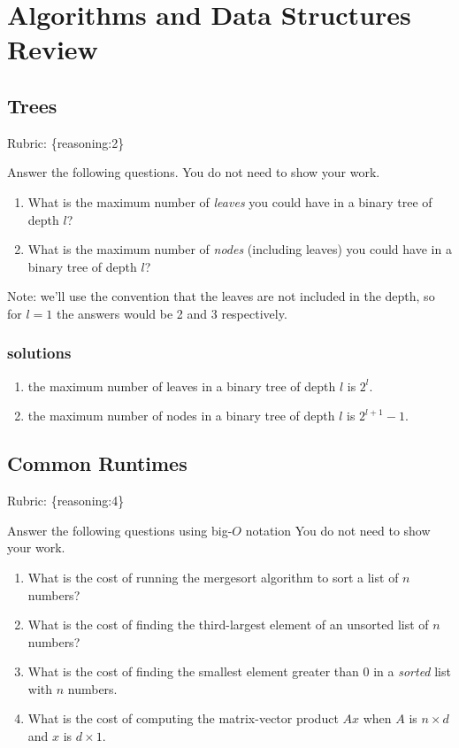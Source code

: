 \documentclass{article}
\def\rubric#1{\gre{Rubric: \{#1\}}}{}
\def\blu#1{{\color{blu}#1}}
\def\gre#1{{\color{gre}#1}}
\def\enum#1{\begin{enumerate}#1\end{enumerate}}
\begin{document}
\section{Algorithms and Data Structures Review}

\subsection{Trees}
\rubric{reasoning:2}

\blu{Answer the following questions.} You do not need to show your work.

\begin{enumerate}
\item What is the maximum number of \emph{leaves} you could have in a binary tree of depth $l$?
\item What is the maximum number of \emph{nodes} (including leaves) you could have in a binary tree of depth $l$?
\end{enumerate}
Note: we'll use the convention that the leaves are not included in the depth, so for $l=1$ the answers would be 2 and 3 respectively.

\subsubsection{solutions}
\enum{
\item the maximum number of leaves in a binary tree of depth $l$ is $2^l$.
\item the maximum number of nodes in a binary tree of depth $ l$ is $2^{l+1}-1$.
}

\subsection{Common Runtimes}
\rubric{reasoning:4}

\blu{Answer the following questions using big-$O$ notation} You do not need to show your work.
\begin{enumerate}
\item What is the cost of running the mergesort algorithm to sort  a list of $n$ numbers?
\item What is the cost of finding the third-largest element of an unsorted list of $n$ numbers?
\item What is the cost of finding the smallest element greater than 0 in a \emph{sorted} list with $n$ numbers.
\item What is the cost of computing the matrix-vector product $Ax$ when $A$ is $n \times d$ and $x$ is $d \times 1$.
\end{enumerate}
\end{document}

